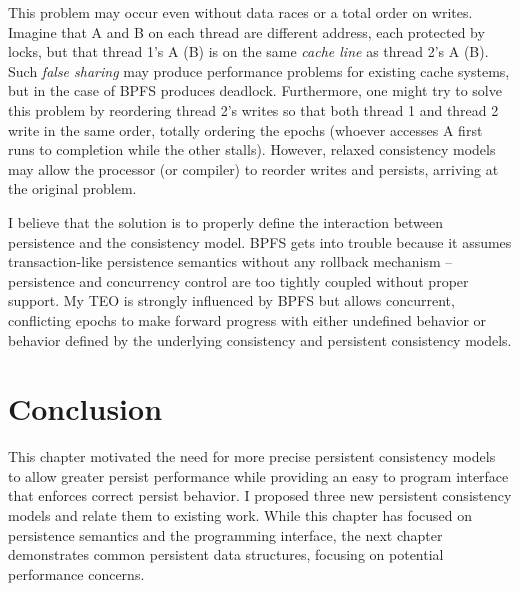 This problem may occur even without data races or a total order on writes.
Imagine that A and B on each thread are different address, each protected by locks, but that thread 1's A (B) is on the same \emph{cache line} as thread 2's A (B).
Such \emph{false sharing} may produce performance problems for existing cache systems, but in the case of BPFS produces deadlock.
Furthermore, one might try to solve this problem by reordering thread 2's writes so that both thread 1 and thread 2 write in the same order, totally ordering the epochs (whoever accesses A first runs to completion while the other stalls).
However, relaxed consistency models may allow the processor (or compiler) to reorder writes and persists, arriving at the original problem.

I believe that the solution is to properly define the interaction between persistence and the consistency model.
BPFS gets into trouble because it assumes transaction-like persistence semantics without any rollback mechanism -- persistence and concurrency control are too tightly coupled without proper support.
My TEO is strongly influenced by BPFS but allows concurrent, conflicting epochs to make forward progress with either undefined behavior or behavior defined by the underlying consistency and persistent consistency models.

\section{Conclusion}
\label{sec:PMC:Conclusion}

This chapter motivated the need for more precise persistent consistency models to allow greater persist performance while providing an easy to program interface that enforces correct persist behavior.
I proposed three new persistent consistency models and relate them to existing work.
While this chapter has focused on persistence semantics and the programming interface, the next chapter demonstrates common persistent data structures, focusing on potential performance concerns.
